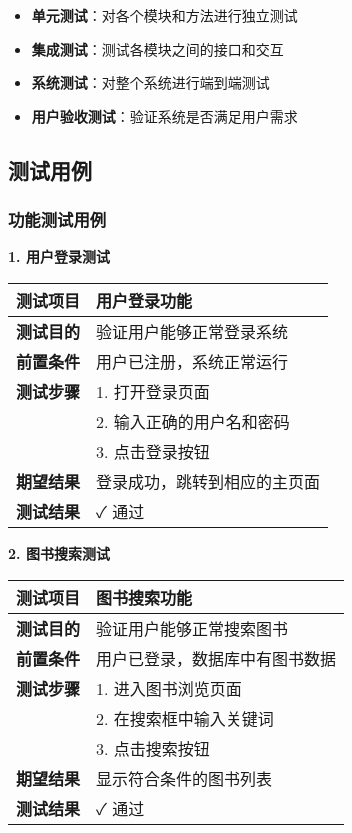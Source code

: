 \documentclass[12pt,a4paper]{article}
\begin{document}
\begin{itemize}
    \item \textbf{单元测试}：对各个模块和方法进行独立测试
    \item \textbf{集成测试}：测试各模块之间的接口和交互
    \item \textbf{系统测试}：对整个系统进行端到端测试
    \item \textbf{用户验收测试}：验证系统是否满足用户需求
\end{itemize}

\subsection{测试用例}

\subsubsection{功能测试用例}

\textbf{1. 用户登录测试}
\begin{longtable}{|l|p{8cm}|}
\hline
\textbf{测试项目} & 用户登录功能 \\
\hline
\textbf{测试目的} & 验证用户能够正常登录系统 \\
\hline
\textbf{前置条件} & 用户已注册，系统正常运行 \\
\hline
\textbf{测试步骤} & 1. 打开登录页面\\
& 2. 输入正确的用户名和密码\\
& 3. 点击登录按钮 \\
\hline
\textbf{期望结果} & 登录成功，跳转到相应的主页面 \\
\hline
\textbf{测试结果} & ✓ 通过 \\
\hline
\end{longtable}

\textbf{2. 图书搜索测试}
\begin{longtable}{|l|p{8cm}|}
\hline
\textbf{测试项目} & 图书搜索功能 \\
\hline
\textbf{测试目的} & 验证用户能够正常搜索图书 \\
\hline
\textbf{前置条件} & 用户已登录，数据库中有图书数据 \\
\hline
\textbf{测试步骤} & 1. 进入图书浏览页面\\
& 2. 在搜索框中输入关键词\\
& 3. 点击搜索按钮 \\
\hline
\textbf{期望结果} & 显示符合条件的图书列表 \\
\hline
\textbf{测试结果} & ✓ 通过 \\
\hline
\end{longtable}
\end{document}
